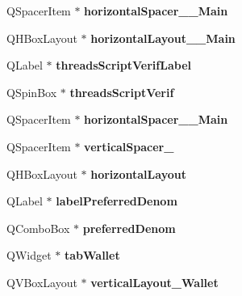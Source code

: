 \begin{DoxyCompactItemize}
Q\+Spacer\+Item $\ast$ {\bfseries horizontal\+Spacer\+\_\+\_\+\+Main}
\item 
\mbox{\label{class_ui___options_dialog_aed4bff80ae9dfa14680539df5f4f0337}} 
Q\+H\+Box\+Layout $\ast$ {\bfseries horizontal\+Layout\+\_\+\_\+\+Main}
\item 
\mbox{\label{class_ui___options_dialog_ad277836d48ec652d28baad74c3c83105}} 
Q\+Label $\ast$ {\bfseries threads\+Script\+Verif\+Label}
\item 
\mbox{\label{class_ui___options_dialog_a27000bcc44da7cf45007878a0f65b57b}} 
Q\+Spin\+Box $\ast$ {\bfseries threads\+Script\+Verif}
\item 
\mbox{\label{class_ui___options_dialog_a755a3682a71ababf80f21264552ab05e}} 
Q\+Spacer\+Item $\ast$ {\bfseries horizontal\+Spacer\+\_\+\_\+\+Main}
\item 
\mbox{\label{class_ui___options_dialog_a7041f542f255f65ca3f9ba707464cb1b}} 
Q\+Spacer\+Item $\ast$ {\bfseries vertical\+Spacer\+\_}
\item 
\mbox{\label{class_ui___options_dialog_aec38186e4ad48f8dcb09c4c77227ba08}} 
Q\+H\+Box\+Layout $\ast$ {\bfseries horizontal\+Layout}
\item 
\mbox{\label{class_ui___options_dialog_a9093cc26171be3bf5374ad65a8155c6a}} 
Q\+Label $\ast$ {\bfseries label\+Preferred\+Denom}
\item 
\mbox{\label{class_ui___options_dialog_ae7ef03a7fd533782c1d589885318ab85}} 
Q\+Combo\+Box $\ast$ {\bfseries preferred\+Denom}
\item 
\mbox{\label{class_ui___options_dialog_aa15fc1d87138ced51f065b00db695f9a}} 
Q\+Widget $\ast$ {\bfseries tab\+Wallet}
\item 
\mbox{\label{class_ui___options_dialog_a9f3502762bacf3a717e3f4858e621447}} 
Q\+V\+Box\+Layout $\ast$ {\bfseries vertical\+Layout\+\_\+\+Wallet}

\end{DoxyCompactItemize}
